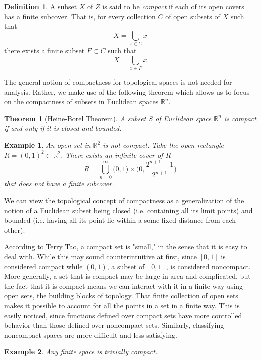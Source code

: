 \documentclass{article}
\newtheorem{theorem}{Theorem}[section]
\newtheorem{example}{Example}[section]
\theoremstyle{remark}
\theoremstyle{definition}
\newtheorem{definition}{Definition}[section]
\begin{document}
\begin{definition}
A subset $X$ of $Z$ is said to be \textit{compact} if each of its open covers has a finite subcover. That is, for every collection $C$ of open subsets of $X$ such that 
\[ X = \bigcup_{x \in C} x\]
there exists a finite subset $F \subset C$ such that
\[X = \bigcup_{x \in F} x\]
\end{definition}

The general notion of compactness for topological spaces is not needed for analysis. Rather, we make use of the following theorem which allows us to focus on the compactness of subsets in Euclidean spaces $\mathbb{R}^n$. 

\begin{theorem}[Heine-Borel Theorem] 
A subset $S$ of Euclidean space $\mathbb{R}^n$ is compact if and only if it is closed and bounded. 
\end{theorem}

\begin{example}
An open set in $\mathbb{R}^2$ is not compact. Take the open rectangle $ R = (0,1)^2 \subset \mathbb{R}^2$. There exists an infinite cover of $R$
\[R = \bigcup_{n=0}^\infty \big(0,1\big) \times \bigg( 0, \frac{ 2^{n+1} - 1}{2^{n+1}} \bigg) \]
that does not have a finite subcover. 
\end{example}

We can view the topological concept of compactness as a generalization of the notion of a Euclidean subset being closed (i.e. containing all its limit points) and bounded (i.e. having all its point lie within a some fixed distance from each other). 

According to Terry Tao, a compact set is "small," in the sense that it is easy to deal with. While this may sound counterintuitive at first, since $[0,1]$ is considered compact while $(0,1)$, a subset of $[0,1]$, is considered noncompact. More generally, a set that is compact may be large in area and complicated, but the fact that it is compact means we can interact with it in a finite way using open sets, the building blocks of topology. That finite collection of open sets makes it possible to account for all the points in a set in a finite way. This is easily noticed, since functions defined over compact sets have more controlled behavior than those defined over noncompact sets. Similarly, classifying noncompact spaces are more difficult and less satisfying. 

\begin{example}
Any finite space is trivially compact. 
\end{example}
\end{document}
